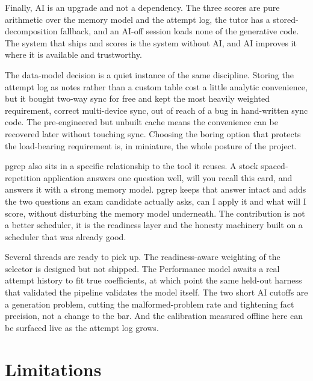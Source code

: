 \documentclass[11pt]{article}
\begin{document}
Finally, AI is an upgrade and not a dependency. The three scores are pure arithmetic
over the memory model and the attempt log, the tutor has a stored-decomposition
fallback, and an AI-off session loads none of the generative code. The system that
ships and scores is the system without AI, and AI improves it where it is available
and trustworthy.

The data-model decision is a quiet instance of the same discipline. Storing the attempt
log as notes rather than a custom table cost a little analytic convenience, but it
bought two-way sync for free and kept the most heavily weighted requirement, correct
multi-device sync, out of reach of a bug in hand-written sync code. The pre-engineered
but unbuilt cache means the convenience can be recovered later without touching sync.
Choosing the boring option that protects the load-bearing requirement is, in miniature,
the whole posture of the project.

pgrep also sits in a specific relationship to the tool it reuses. A stock
spaced-repetition application answers one question well, will you recall this card, and
answers it with a strong memory model. pgrep keeps that answer intact and adds the two
questions an exam candidate actually asks, can I apply it and what will I score, without
disturbing the memory model underneath. The contribution is not a better scheduler, it
is the readiness layer and the honesty machinery built on a scheduler that was already
good.

Several threads are ready to pick up. The readiness-aware weighting of the selector is
designed but not shipped. The Performance model awaits a real attempt history to fit
true coefficients, at which point the same held-out harness that validated the pipeline
validates the model itself. The two short AI cutoffs are a generation problem, cutting
the malformed-problem rate and tightening fact precision, not a change to the bar. And
the calibration measured offline here can be surfaced live as the attempt log grows.

\section{Limitations}
\end{document}
